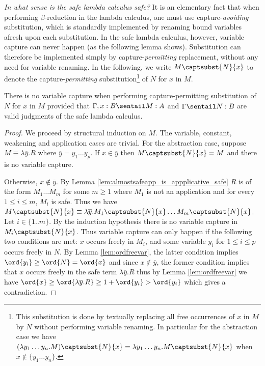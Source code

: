 \emph{In what sense is the safe lambda calculus safe?} It is an
elementary fact that when performing $\beta$-reduction in the lambda
calculus, one must use capture-\emph{avoiding} substitution, which
is standardly implemented by renaming bound variables afresh upon
each substitution. In the safe lambda calculus, however, variable
capture can never happen (as the following lemma shows).
Substitution can therefore be implemented simply by
capture-\emph{permitting} replacement, without any need for variable
renaming. In the following, we write $M\captsubst{N}{x}$ to denote
the capture-\emph{permitting} substitution\footnote{This
substitution is done by textually replacing all free occurrences of
$x$ in $M$ by $N$ without performing variable renaming.  In
particular for the abstraction
  case we have
$(\lambda y_1\ldots y_n . M)\captsubst{N}{x} = \lambda y_1\ldots y_n . M\captsubst{N}{x}$ when $x\not\in
  \{ y_1\ldots y_n \}$.}
of $N$ for $x$ in $M$.

\begin{lemma}\label{lem:nvc}
\label{lem:nocapture} There is no variable capture when performing
capture-permitting substitution of $N$ for $x$ in $M$ provided that
$\Gamma, x:B \sentail M : A$ and $\Gamma \sentail  N : B$ are valid
judgments of the safe lambda calculus.
\end{lemma}

\begin{proof}
  We proceed by structural induction on $M$. The variable, constant, weakening and
  application cases are trivial. For the abstraction case, suppose $M \equiv \lambda \overline{y}. R$ where $\overline{y} = y_1 \ldots y_p$. If $x \in \overline{y}$ then $M \captsubst{N}{x} = M$ and there is no variable capture.

 Otherwise, $x \not\in \overline{y}$. By Lemma \ref{lem:almostsafeapp_is_appplicative_safe} $R$ is of the
  form $M_1 \ldots M_m$ for some $m\geq 1$ where $M_1$ is not an application and for every $1 \leq i\leq m$, $M_i$ is safe.
 Thus we have $M \captsubst{N}{x} \equiv \lambda \overline{y} . M_1 \captsubst{N}{x} \ldots M_m \captsubst{N}{x}$.  Let $i\in\{1..m\}$. By the induction hypothesis there is no variable capture in $M_i \captsubst{N}{x}$.  Thus variable capture can only happen if the following two conditions are met: $x$ occurs freely in $M_i$, and some variable $y_i$ for $1 \leq i \leq p$ occurs freely in $N$. By Lemma \ref{lem:ordfreevar}, the latter condition implies $\ord{y_i} \geq \ord{N} = \ord{x}$ and  since $x \not \in \overline{y}$, the former condition implies that $x$ occurs freely in the safe term $\lambda \overline{y}. R$
  thus by Lemma \ref{lem:ordfreevar} we have $ \ord{x} \geq
  \ord{\lambda \overline{y} . R} \geq 1+ \ord{y_i} > \ord{y_i}$ which  gives a contradiction.
\end{proof}

